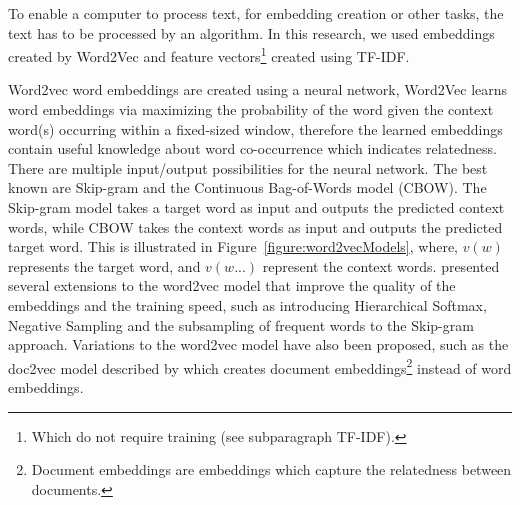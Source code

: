 \documentclass[../../Thesis.tex]{subfiles}
\begin{document}
To enable a computer to process text, for embedding creation or other tasks, the text has to be processed by an algorithm. In this research, we used embeddings created by Word2Vec and feature vectors\footnote{Which do not require training (see subparagraph TF-IDF).} created using TF-IDF.
\begin{jumpin}
Word2vec word embeddings are created using a neural network, Word2Vec learns word embeddings via maximizing the probability of the word given the context word(s) occurring within a fixed-sized window, therefore the learned embeddings contain useful knowledge about word co-occurrence\cite{nalisnick2016improving} which indicates relatedness\cite{lai2016generate}. There are multiple input/output possibilities for the neural network. The best known are Skip-gram and the Continuous Bag-of-Words model (CBOW). The Skip-gram model takes a target word as input and outputs the predicted context words, while CBOW takes the context words as input and outputs the predicted target word\cite{nalisnick2016improving, pennington2014glove}. This is illustrated in Figure~\ref{figure:word2vecModels}, where, $v(w)$ represents the target word, and $v(w...)$ represent the context words. \citet{mikolov2013distributed}\cite{mikolov2013efficient} presented several extensions to the word2vec model that improve the quality of the embeddings and the training speed, such as introducing Hierarchical Softmax, Negative Sampling and the subsampling of frequent words to the Skip-gram approach. Variations to the word2vec model have also been proposed, such as the doc2vec model described by \citet{lau2016empirical} which creates document embeddings\footnote{Document embeddings are embeddings which capture the relatedness between documents.} instead of word embeddings.


\end{jumpin}
\end{document}
